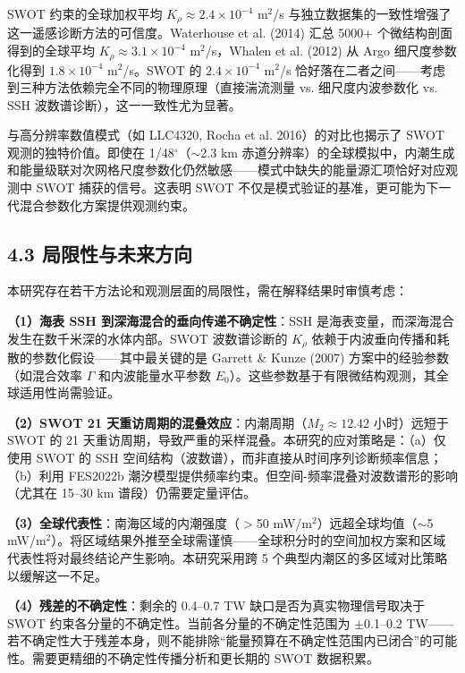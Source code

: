\documentclass[11pt,a4paper]{article}
\begin{document}
SWOT 约束的全球加权平均 $K_\rho \approx 2.4 \times 10^{-4}$ m$^2$/s 与独立数据集的一致性增强了这一遥感诊断方法的可信度。Waterhouse et al. (2014) 汇总 5000+ 个微结构剖面得到的全球平均 $K_\rho \approx 3.1 \times 10^{-4}$ m$^2$/s，Whalen et al. (2012) 从 Argo 细尺度参数化得到 $1.8 \times 10^{-4}$ m$^2$/s。SWOT 的 $2.4 \times 10^{-4}$ m$^2$/s 恰好落在二者之间——考虑到三种方法依赖完全不同的物理原理（直接湍流测量 vs. 细尺度内波参数化 vs. SSH 波数谱诊断），这一一致性尤为显著。\par

与高分辨率数值模式（如 LLC4320, Rocha et al. 2016）的对比也揭示了 SWOT 观测的独特价值。即使在 1/48$^\circ$（$\sim$2.3 km 赤道分辨率）的全球模拟中，内潮生成和能量级联对次网格尺度参数化仍然敏感——模式中缺失的能量源汇项恰好对应观测中 SWOT 捕获的信号。这表明 SWOT 不仅是模式验证的基准，更可能为下一代混合参数化方案提供观测约束。\par

\subsection*{4.3  局限性与未来方向}

本研究存在若干方法论和观测层面的局限性，需在解释结果时审慎考虑：

\textbf{（1）海表 SSH 到深海混合的垂向传递不确定性}：SSH 是海表变量，而深海混合发生在数千米深的水体内部。SWOT 波数谱诊断的 $K_\rho$ 依赖于内波垂向传播和耗散的参数化假设——其中最关键的是 Garrett \& Kunze (2007) 方案中的经验参数（如混合效率 $\Gamma$ 和内波能量水平参数 $E_0$）。这些参数基于有限微结构观测，其全球适用性尚需验证。\par

\textbf{（2）SWOT 21 天重访周期的混叠效应}：内潮周期（$M_2 \approx 12.42$ 小时）远短于 SWOT 的 21 天重访周期，导致严重的采样混叠。本研究的应对策略是：（a）仅使用 SWOT 的 SSH 空间结构（波数谱），而非直接从时间序列诊断频率信息；（b）利用 FES2022b 潮汐模型提供频率约束。但空间-频率混叠对波数谱形的影响（尤其在 15--30 km 谱段）仍需要定量评估。\par

\textbf{（3）全球代表性}：南海区域的内潮强度（$>$50 mW/m$^2$）远超全球均值（$\sim$5 mW/m$^2$）。将区域结果外推至全球需谨慎——全球积分时的空间加权方案和区域代表性将对最终结论产生影响。本研究采用跨 5 个典型内潮区的多区域对比策略以缓解这一不足。\par

\textbf{（4）残差的不确定性}：剩余的 0.4--0.7 TW 缺口是否为真实物理信号取决于 SWOT 约束各分量的不确定性。当前各分量的不确定性范围为 $\pm$0.1--0.2 TW——若不确定性大于残差本身，则不能排除``能量预算在不确定性范围内已闭合''的可能性。需要更精细的不确定性传播分析和更长期的 SWOT 数据积累。\par
\end{document}
